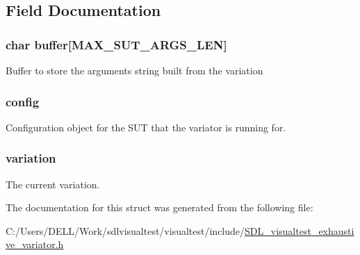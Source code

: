 \subsection{Field Documentation}
\hypertarget{struct_s_d_l_visual_test___exhaustive_variator_a2b599af5b00be0f525ffc18feb0775a8}{
\subsubsection[{buffer}]{\setlength{\rightskip}{0pt plus 5cm}char buffer\mbox{[}{\bf M\-A\-X\-\_\-\-S\-U\-T\-\_\-\-A\-R\-G\-S\-\_\-\-L\-E\-N}\mbox{]}}}\label{struct_s_d_l_visual_test___exhaustive_variator_a2b599af5b00be0f525ffc18feb0775a8}
Buffer to store the arguments string built from the variation \hypertarget{struct_s_d_l_visual_test___exhaustive_variator_ab66b4220589b2e2b6e1fde7d6c20bd72}{
\subsubsection[{config}]{ config}}\label{struct_s_d_l_visual_test___exhaustive_variator_ab66b4220589b2e2b6e1fde7d6c20bd72}
Configuration object for the S\-U\-T that the variator is running for. \hypertarget{struct_s_d_l_visual_test___exhaustive_variator_a11c2995cf19b41c4a1b1f8d9b4081ff7}{
\subsubsection[{variation}]{ variation}}\label{struct_s_d_l_visual_test___exhaustive_variator_a11c2995cf19b41c4a1b1f8d9b4081ff7}
The current variation. 

The documentation for this struct was generated from the following file\-:\begin{DoxyCompactItemize}
\item 
C\-:/\-Users/\-D\-E\-L\-L/\-Work/sdlvisualtest/visualtest/include/\hyperlink{_s_d_l__visualtest__exhaustive__variator_8h}{S\-D\-L\-\_\-visualtest\-\_\-exhaustive\-\_\-variator.\-h}\end{DoxyCompactItemize}

